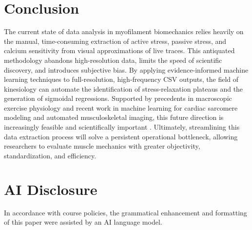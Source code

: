 \documentclass[jou]{apa7}
\begin{document}
\section{Conclusion}

The current state of data analysis in myofilament biomechanics relies heavily on the manual, time-consuming extraction of active stress, passive stress, and calcium sensitivity from visual approximations of live traces. This antiquated methodology abandons high-resolution data, limits the speed of scientific discovery, and introduces subjective bias. By applying evidence-informed machine learning techniques to full-resolution, high-frequency CSV outputs, the field of kinesiology can automate the identification of stress-relaxation plateaus and the generation of sigmoidal regressions. Supported by precedents in macroscopic exercise physiology and recent work in machine learning for cardiac sarcomere modeling and automated musculoskeletal imaging, this future direction is increasingly feasible and scientifically important \parencite{Zignoli2019,Aboelkassem2025,Rivera2025,Lee2025}. Ultimately, streamlining this data extraction process will solve a persistent operational bottleneck, allowing researchers to evaluate muscle mechanics with greater objectivity, standardization, and efficiency.

\section{AI Disclosure}

In accordance with course policies, the grammatical enhancement and formatting of this paper were assisted by an AI language model. 

\printbibliography
\end{document}
